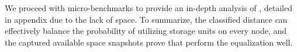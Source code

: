 We proceed with micro-benchmarks to provide an in-depth analysis of \dht, detailed in appendix due to the lack of space.
To summarize, the classified distance can effectively balance the probability of utilizing storage units on every node, and the captured available space snapshots prove that \dht perform the equalization well.